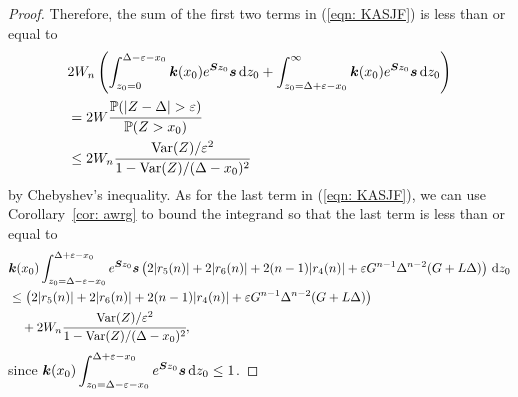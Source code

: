 \begin{proof}
		Therefore, the sum of the first two terms in (\ref{eqn: KASJF}) is less than or equal to 
		\begin{align}
		&2W_n\left(\int_{z_0=0}^{\Delta-\varepsilon-x_0}\bs k(x_0)e^{\bs S z_0} \bs s \wrt z_0+\int_{z_0=\Delta+\varepsilon-x_0}^\infty \bs k(x_0)e^{\bs S z_0} \bs s \wrt z_0\right)\nonumber 
		\\\nonumber &= 2W \cfrac{\mathbb P(|Z-\Delta|> \varepsilon)}{\mathbb P(Z> x_0)}
		\\&\leq 2W_n\cfrac{\var(Z)/\varepsilon^2}{1-\var(Z)/(\Delta-x_0)^2}
		\end{align}
		by Chebyshev's inequality. As for the last term in (\ref{eqn: KASJF}), we can use Corollary~\ref{cor: awrg} to bound the integrand so that the last term is less than or equal to 
		\begin{align}
		\nonumber&\boldsymbol k(x_0) \int_{z_0=\Delta-\varepsilon-x_0}^{\Delta+\varepsilon-x_0} e^{\boldsymbol Sz_0}\boldsymbol s \left( 2|r_5(n)| + 2|r_6(n)| + 2(n-1)|r_4(n)| + \varepsilon G^{n-1}\Delta^{n-2}(G+L\Delta) \right) \, \mathrm{d} z_0
		\\\nonumber&\leq  \left( 2|r_5(n)| + 2|r_6(n)| + 2(n-1)|r_4(n)| + \varepsilon G^{n-1}\Delta^{n-2}(G+L\Delta) \right)
		\\&\quad{}+2W_n\cfrac{\mathrm{Var}(Z)/\varepsilon^2}{1-\mathrm{Var}(Z)/(\Delta-x_0)^2} ,
	\end{align}
	since \(\displaystyle \boldsymbol k(x_0) \int_{z_0=\Delta-\varepsilon-x_0}^{\Delta+\varepsilon-x_0} e^{\boldsymbol Sz_0}\boldsymbol s\, \mathrm{d} z_0\leq 1\). 
\end{proof}

